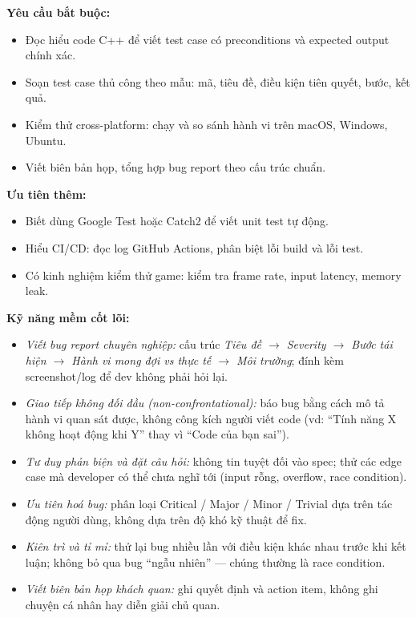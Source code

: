\documentclass[12pt,a4paper]{article}
\begin{document}
\noindent\textbf{Yêu cầu bắt buộc:}
\begin{itemize}[nosep]
    \item Đọc hiểu code C++ để viết test case có preconditions và expected output chính xác.
    \item Soạn test case thủ công theo mẫu: mã, tiêu đề, điều kiện tiên quyết, bước, kết quả.
    \item Kiểm thử cross-platform: chạy và so sánh hành vi trên macOS, Windows, Ubuntu.
    \item Viết biên bản họp, tổng hợp bug report theo cấu trúc chuẩn.
\end{itemize}

\noindent\textbf{Ưu tiên thêm:}
\begin{itemize}[nosep]
    \item Biết dùng Google Test hoặc Catch2 để viết unit test tự động.
    \item Hiểu CI/CD: đọc log GitHub Actions, phân biệt lỗi build và lỗi test.
    \item Có kinh nghiệm kiểm thử game: kiểm tra frame rate, input latency, memory leak.
\end{itemize}

\noindent\textbf{Kỹ năng mềm cốt lõi:}
\begin{itemize}[nosep]
    \item \textit{Viết bug report chuyên nghiệp:} cấu trúc \textit{Tiêu đề $\to$ Severity
          $\to$ Bước tái hiện $\to$ Hành vi mong đợi vs thực tế $\to$ Môi trường}; đính kèm
          screenshot/log để dev không phải hỏi lại.
    \item \textit{Giao tiếp không đối đầu (non-confrontational):} báo bug bằng cách mô tả
          hành vi quan sát được, không công kích người viết code (vd: ``Tính năng X không
          hoạt động khi Y'' thay vì ``Code của bạn sai'').
    \item \textit{Tư duy phản biện và đặt câu hỏi:} không tin tuyệt đối vào spec; thử các
          edge case mà developer có thể chưa nghĩ tới (input rỗng, overflow, race condition).
    \item \textit{Ưu tiên hoá bug:} phân loại Critical / Major / Minor / Trivial dựa trên
          tác động người dùng, không dựa trên độ khó kỹ thuật để fix.
    \item \textit{Kiên trì và tỉ mỉ:} thử lại bug nhiều lần với điều kiện khác nhau trước
          khi kết luận; không bỏ qua bug ``ngẫu nhiên'' --- chúng thường là race condition.
    \item \textit{Viết biên bản họp khách quan:} ghi quyết định và action item, không ghi
          chuyện cá nhân hay diễn giải chủ quan.
\end{itemize}
\end{document}

